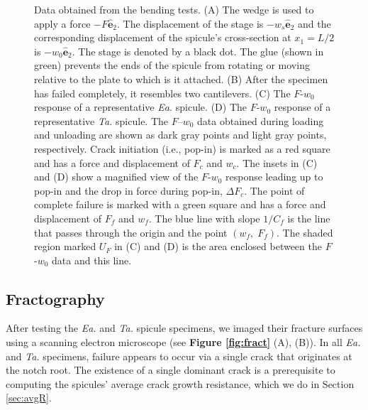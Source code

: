 \documentclass[12pt,onecolumn]{article}
\makeatletter
\newcommand{\ey}{{\bm{\hat{e}}}_2}
\newcommand{\TA}{\textit{Ta.\@}\xspace}
\newcommand{\EA}{\textit{Ea.\@}\xspace}
\makeatother
\begin{document}
\begin{bibunit}
\begin{figure}[ht!]
			\caption{Data obtained from the bending tests. (A) The wedge is used to apply a force $-F\ey$. The displacement of the stage is $-w_s\ey$ and the corresponding displacement of the spicule's cross-section at $x_1=L/2$ is $-w_0\ey$. The stage is denoted by a black dot. The glue (shown in green) prevents the ends of the spicule from rotating or moving relative to the plate to which is it attached. (B) After the specimen has failed completely, it resembles two cantilevers. (C) The $F$-$w_0$ response of a representative \EA spicule. (D) The $F$-$w_0$ response of a representative \TA spicule. The $F$--$w_0$ data obtained during loading and unloading are shown as dark gray points and light gray points, respectively. Crack initiation (i.e., pop-in) is marked as a red square and has a force and displacement of $F_c$ and $w_c$. The insets in (C) and (D) show a magnified view of the $F$-$w_0$ response leading up to pop-in and the drop in force during pop-in, $\Delta F_c$. The point of complete failure is marked with a green square and has a force and displacement of $F_f$ and $w_f$. The blue line with slope $1/C_f$ is the line that passes through the origin and the point $(w_f,\; F_f)$. The shaded region marked $U_F$ in (C) and (D) is the area enclosed between the $F$-$w_0$ data and this line.
			}
			\label{fig:test}
			\end{figure}
 			
			
\subsection{Fractography}
\label{sec:fracto}
 After testing the \EA and \TA spicule specimens, we imaged their fracture surfaces using a scanning electron microscope (see {\bf Figure \ref{fig:fract}} (A), (B)). In all \EA and \TA specimens, failure appears to occur via a single crack that originates at the notch root. The existence of a single dominant crack is a prerequisite to computing the spicules' average crack growth resistance, which we do in Section \ref{sec:avgR}. 
 

\end{bibunit}
\end{document}
